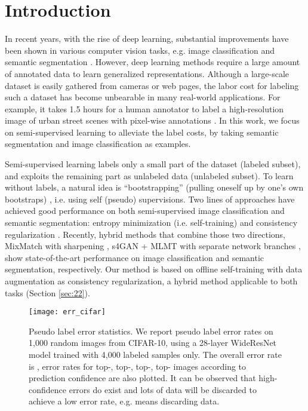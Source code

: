 \documentclass[preprint,review,10pt]{elsarticle}
\begin{document}
\section{Introduction}
\label{sec:1}

In recent years, with the rise of deep learning, substantial improvements have been shown in various computer vision tasks, e.g. image classification \cite{zagoruyko2016wide,wu2019wider} and semantic segmentation \cite{deeplabv2,fu2020contextual}. However, deep learning methods require a large amount of annotated data to learn generalized representations. Although a large-scale dataset is easily gathered from cameras or web pages, the labor cost for labeling such a dataset has become unbearable in many real-world applications. For example, it takes 1.5 hours for a human annotator to label a high-resolution image of urban street scenes with pixel-wise annotations \cite{cordts2016cityscapes}.
In this work, we focus on semi-supervised learning to alleviate the label costs, by taking semantic segmentation and image classification as examples.


Semi-supervised learning labels only a small part of the dataset (labeled subset), and exploits the remaining part as unlabeled data (unlabeled subset). To learn without labels, a natural idea is  ``bootstrapping'' (pulling oneself up by one's own bootstraps) \cite{yarowsky1995unsupervised}, i.e. using self (pseudo) supervisions.
Two lines of approaches have achieved good performance on both semi-supervised image classification and semantic segmentation: entropy minimization (i.e. self-training) \cite{lee2013pseudo,hung} and consistency regularization \cite{tarvainen2017mean,french2019semisupervised}. Recently, hybrid methods that combine those two directions, MixMatch with sharpening \cite{berthelot2019mixmatch}, s4GAN + MLMT with separate network branches \cite{mittal2019semi}, show state-of-the-art performance on image classification and semantic segmentation, respectively. Our method is based on offline self-training with data augmentation as consistency regularization, a hybrid method applicable to both tasks (Section \ref{sec:22}).

\begin{figure}[t]
\centering
\texttt{[image: err\_cifar]}
\caption{Pseudo label error statistics. We report pseudo label error rates on 1,000 random images from CIFAR-10, using a 28-layer WideResNet model trained with 4,000 labeled samples only. The overall error rate is , error rates for top-, top-, top-, top- images according to prediction confidence are also plotted. It can be observed that high-confidence errors do exist and lots of data will be discarded to achieve a low error rate, e.g.  means discarding  data. }
\label{fig2}
\end{figure}
\end{document}
